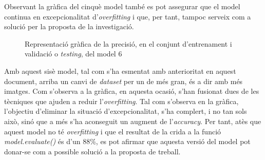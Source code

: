 \documentclass[a4paper,12pt]{report}
\begin{document}
Observant la gràfica del cinquè model també es pot assegurar que el model continua en excepcionalitat d'\textit{overfitting} i que, per tant, tampoc serveix com a solució per la proposta de la investigació.
\begin{figure}[H]
    \centering
    \caption{Representació gràfica de la precisió, en el conjunt d'entrenament i validació o \textit{testing}, del model 6}
    \label{fig:model6}
\end{figure}
Amb aquest sisè model, tal com s'ha esmentat amb anterioritat en aquest document, arriba un canvi de \textit{dataset} per un de més gran, és a dir amb més imatges. Com s'observa a la gràfica, en aquesta ocasió, s'han fusionat dues de les tècniques que ajuden a reduir l'\textit{overfitting}. Tal com s'observa en la gràfica, l'objectiu d'eliminar la situació d'excepcionalitat, s'ha complert, i no tan sols això, sinó que a més s'ha aconseguit un augment de l'\textit{accuracy}. Per tant, atès que aquest model no té \textit{overfitting} i que el resultat de la crida a la funció \textit{model.evaluate()} és d'un 88\%, es pot afirmar que aquesta versió del model pot donar-se com a possible solució a la proposta de treball.
\end{document}
